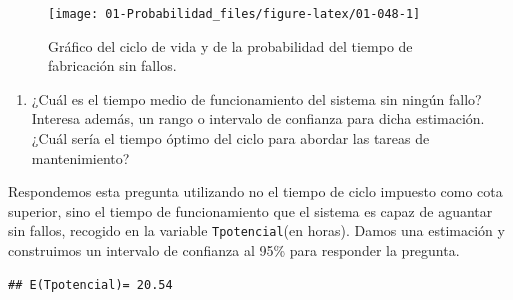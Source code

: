\documentclass[
]{book}
\newenvironment{Shaded}{\begin{snugshade}}{\end{snugshade}}
\newcommand{\DecValTok}[1]{\textcolor[rgb]{0.00,0.00,0.81}{#1}}
\newcommand{\FloatTok}[1]{\textcolor[rgb]{0.00,0.00,0.81}{#1}}
\newcommand{\FunctionTok}[1]{\textcolor[rgb]{0.00,0.00,0.00}{#1}}
\newcommand{\NormalTok}[1]{#1}
\newcommand{\OtherTok}[1]{\textcolor[rgb]{0.56,0.35,0.01}{#1}}
\newcommand{\SpecialCharTok}[1]{\textcolor[rgb]{0.00,0.00,0.00}{#1}}
\newcommand{\StringTok}[1]{\textcolor[rgb]{0.31,0.60,0.02}{#1}}
\providecommand{\tightlist}{%
  \setlength{\itemsep}{0pt}\setlength{\parskip}{0pt}}
\theoremstyle{definition}
\theoremstyle{definition}
\theoremstyle{definition}
\theoremstyle{definition}
\theoremstyle{remark}
\begin{document}
\begin{figure}

{\centering \texttt{[image: 01-Probabilidad\_files/figure-latex/01-048-1]} 

}

\caption{Gráfico del ciclo de vida y de la probabilidad del tiempo de fabricación sin fallos.}\label{fig:01-048}
\end{figure}

\begin{enumerate}
\def\labelenumi{\arabic{enumi}.}
\setcounter{enumi}{2}
\tightlist
\item
  ¿Cuál es el tiempo medio de funcionamiento del sistema sin ningún fallo? Interesa además, un rango o intervalo de confianza para dicha estimación. ¿Cuál sería el tiempo óptimo del ciclo para abordar las tareas de mantenimiento?
\end{enumerate}

Respondemos esta pregunta utilizando no el tiempo de ciclo impuesto como cota superior, sino el tiempo de funcionamiento que el sistema es capaz de aguantar sin fallos, recogido en la variable \texttt{Tpotencial}(en horas). Damos una estimación y construimos un intervalo de confianza al 95\% para responder la pregunta.

\begin{Shaded}
\end{Shaded}

\begin{verbatim}
## E(Tpotencial)= 20.54
\end{verbatim}
\end{document}
